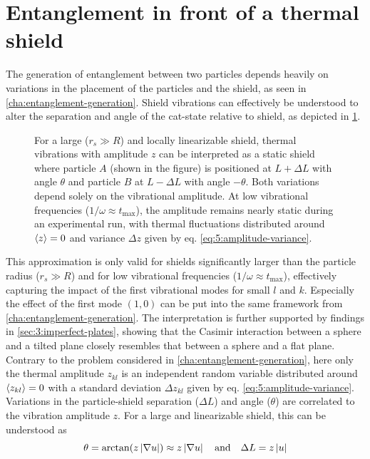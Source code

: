 \section{Entanglement in front of a thermal shield}\label{sec:5:thermal-entanglement}
The generation of entanglement between two particles depends heavily on variations in the placement of the particles and the shield, as seen in \cref{cha:entanglement-generation}.
Shield vibrations can effectively be understood to alter the separation and angle of the cat-state relative to shield, as depicted in \cref{fig:5:vibrating-translation-to-variations}.
\begin{figure}[!htbp]
  \centering
  \def\svgwidth{\textwidth}
  
  \caption{For a large ($r_s \gg R$) and locally linearizable shield, thermal vibrations with amplitude $z$ can be interpreted as a static shield where particle $A$ (shown in the figure) is positioned at $L+\Delta L$ with angle $\theta$ and particle $B$ at $L-\Delta L$ with angle $-\theta$. Both variations depend solely on the vibrational amplitude. At low vibrational frequencies ($1/\omega \approx t_\mathrm{max}$), the amplitude remains nearly static during an experimental run, with thermal fluctuations distributed around $\left\langle z\right\rangle=0$ and variance $\Delta z$ given by eq. \eqref{eq:5:amplitude-variance}.}
  \label{fig:5:vibrating-translation-to-variations}
\end{figure}
This approximation is only valid for shields significantly larger than the particle radius ($r_s \gg R$) and for low vibrational frequencies ($1/\omega \approx t_\mathrm{max}$), effectively capturing the impact of the first vibrational modes for small $l$ and $k$.
Especially the effect of the first mode $(1,0)$ can be put into the same framework from \cref{cha:entanglement-generation}. 
The interpretation is further supported by findings in \cref{sec:3:imperfect-plates}, showing that the Casimir interaction between a sphere and a tilted plane closely resembles that between a sphere and a flat plane.
Contrary to the problem considered in \cref{cha:entanglement-generation}, here only the thermal amplitude $z_{kl}$ is an independent random variable distributed around $\left\langle z_{kl}\right\rangle=0$ with a standard deviation $\Delta z_{kl}$ given by eq. \eqref{eq:5:amplitude-variance}. 
Variations in the particle-shield separation ($\Delta L$) and angle ($\theta$) are correlated to the vibration amplitude $z$.
For a large and linearizable shield, this can be understood as
\begin{equation}
  \theta = \arctan(z \left\lvert\nabla u\right\rvert) \approx z \left\lvert\nabla u\right\rvert \quad \text{and} \quad \Delta L = z \left\lvert u\right\rvert
\end{equation}
